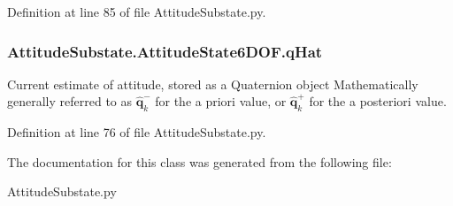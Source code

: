 Definition at line 85 of file Attitude\+Substate.\+py.

\subsubsection[{\texorpdfstring{q\+Hat}{qHat}}]{\setlength{\rightskip}{0pt plus 5cm}Attitude\+Substate.\+Attitude\+State6\+D\+O\+F.\+q\+Hat}\hypertarget{classAttitudeSubstate_1_1AttitudeState6DOF_a36a58a47280151dd544762d9a1d5c35d}{}\label{classAttitudeSubstate_1_1AttitudeState6DOF_a36a58a47280151dd544762d9a1d5c35d}


Current estimate of attitude, stored as a Quaternion object Mathematically generally referred to as $\mathbf{\hat{q}}^{-}_{k}$ for the a priori value, or $\mathbf{\hat{q}}^{+}_{k}$ for the a posteriori value. 



Definition at line 76 of file Attitude\+Substate.\+py.



The documentation for this class was generated from the following file\+:\begin{DoxyCompactItemize}
\item 
Attitude\+Substate.\+py\end{DoxyCompactItemize}
